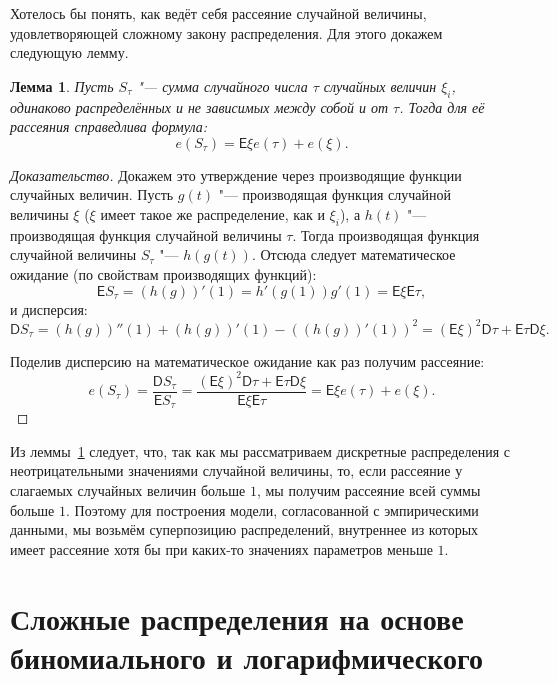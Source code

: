 \documentclass[12pt, specialist, subf, substylefile = spbu_report.rtx]{disser}
\newtheorem{lemma}{Лемма}
\begin{document}
	Хотелось бы понять, как ведёт себя рассеяние случайной величины, удовлетворяющей сложному закону распределения. Для этого докажем следующую лемму.
	
	\begin{lemma}
		Пусть $ S _\tau $ "--- сумма случайного числа $ \tau $ случайных величин $ \xi _i $, одинаково распределённых и не зависимых между собой и от $ \tau $. Тогда для её рассеяния справедлива формула:
		\[
			e (S _\tau) = \mathsf{E} \xi e (\tau) + e (\xi).
		\] 
		\label{lemma:1}
	\end{lemma}
	
	\begin{proof}[Доказательство]
		Докажем это утверждение через производящие функции случайных величин. Пусть $ g(t) $ "--- производящая функция случайной величины $ \xi $ ($ \xi $ имеет такое же распределение, как и $ \xi _i $), а $ h(t) $ "--- производящая функция случайной величины $ \tau $. Тогда производящая функция случайной величины $ S _\tau $ "--- $ h(g(t)) $.
		Отсюда следует математическое ожидание (по свойствам производящих функций):
		\[
			\mathsf{E} S _\tau = \left( h(g) \right)' (1) = h'(g(1)) g'(1) = \mathsf{E} \xi \mathsf{E} \tau, 
		\]
		и дисперсия:
		\[
			\mathsf{D} S _\tau = \left(h(g)\right)'' (1) + \left(h(g)\right)' (1) - \left( \left(h(g)\right)' (1) \right) ^2 = \left( \mathsf{E} \xi \right) ^2 \mathsf{D} \tau + \mathsf{E} \tau \mathsf{D} \xi.
		\]
		
		Поделив дисперсию на математическое ожидание как раз получим рассеяние:
		\[
			e (S _\tau) = \frac {\mathsf{D} S _\tau} {\mathsf{E} S _\tau} = \frac {\left( \mathsf{E} \xi \right) ^2 \mathsf{D} \tau + \mathsf{E} \tau \mathsf{D} \xi} {\mathsf{E} \xi \mathsf{E} \tau} = \mathsf{E} \xi e (\tau) + e (\xi).
		\]
	\end{proof}
	
	Из леммы~\ref{lemma:1} следует, что, так как мы рассматриваем дискретные распределения с неотрицательными значениями случайной величины, то, если рассеяние у слагаемых случайных величин больше $ 1 $, мы получим рассеяние всей суммы больше $ 1 $. Поэтому для построения модели, согласованной с эмпирическими данными, мы возьмём суперпозицию распределений, внутреннее из которых имеет рассеяние хотя бы при каких-то значениях параметров меньше $ 1 $.
	
	\chapter{Сложные распределения на основе биномиального и логарифмического}
	
\end{document}
